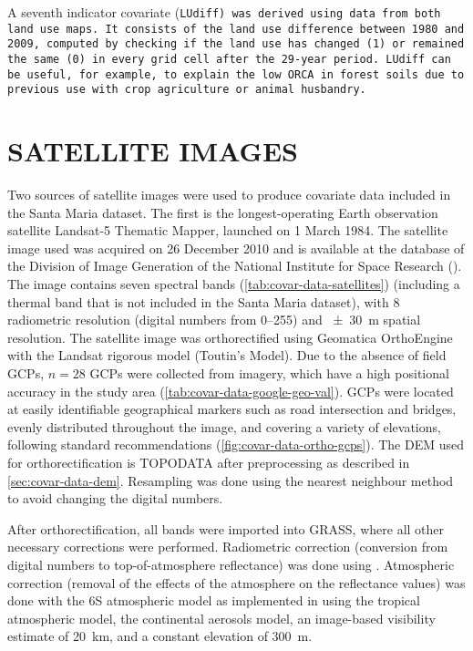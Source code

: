 A seventh indicator covariate (\tt{LUdiff}) was derived using data from both land use maps. It consists of the 
land use difference between \num{1980} and \num{2009}, computed by checking if the land use has changed (1) or 
remained the same (0) in every grid cell after the 29-year period. \tt{LUdiff} can be useful, for example, to 
explain the low \tt{ORCA} in forest soils due to previous use with crop agriculture or animal husbandry.

\section{SATELLITE IMAGES}
\label{sec:covar-data-sat-image}

Two sources of satellite images were used to produce covariate data included in the Santa Maria dataset. The 
first is the longest-operating Earth observation satellite Landsat-5 Thematic Mapper, launched on \num{1} 
March \num{1984}. The satellite image used was acquired on \num{26} December \num{2010} and is available at 
the database of the Division of Image Generation of the National Institute for Space Research (\inpedgi). The 
image contains seven spectral bands (\autoref{tab:covar-data-satellites}) (including a thermal band that is 
not included in the Santa Maria dataset), with \SI{8}{\bit} radiometric resolution (digital numbers from 
\numrange{0}{255}) and \SI{\pm30}{\m} spatial resolution. The satellite image was orthorectified using 
Geomatica\textregistered{} OrthoEngine\textregistered{} with the Landsat rigorous model (Toutin's Model). Due 
to the absence of field GCPs, $n = 28$ GCPs were collected from \googleearth{} imagery, which have a high 
positional accuracy in the study area (\autoref{tab:covar-data-google-geo-val}). GCPs were located 
at easily identifiable geographical markers such as road intersection and bridges, evenly distributed 
throughout the image, and covering a variety of elevations, following standard recommendations 
\cite{PCIGeomatics2007} (\autoref{fig:covar-data-ortho-gcps}). The DEM used for orthorectification is TOPODATA 
after preprocessing as described in \autoref{sec:covar-data-dem}. Resampling was done using the nearest 
neighbour method to avoid changing the digital numbers.

After orthorectification, all bands were imported into GRASS, where all other necessary corrections were 
performed. Radiometric correction (conversion from digital numbers to top-of-atmosphere reflectance) was done
using . Atmospheric correction (removal of the effects of the atmosphere on the 
reflectance values) was done with the 6S atmospheric model \cite{VermoteEtAl1997} as implemented in 
 using the tropical atmospheric model, the continental aerosols model, an image-based 
visibility estimate of \SI{20}{\km}, and a constant elevation of \SI{300}{\m}.

